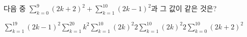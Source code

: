 다음 중 $\displaystyle\sum_{k=0}^{9}(2k+2)^2+\sum_{k=1}^{10}(2k-1)^2$과 그 값이 같은 것은?
\begin{choices32}{$\displaystyle\sum_{k=1}^{19}(2k-1)^2$}{$\displaystyle\sum_{k=1}^{20}k^2$}{$\displaystyle\sum_{k=1}^{10}(2k)^2$}{$2\displaystyle\sum_{k=1}^{10}(2k)^2$}{$2\displaystyle\sum_{k=0}^{10}(2k+2)^2$}\end{choices32}
